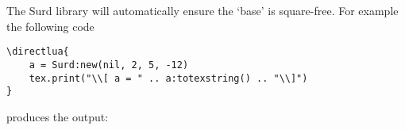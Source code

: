 \documentclass[11pt]{article}
\begin{document}
The Surd library will automatically ensure the `base' is square-free. For example the following code

\begin{lstlisting}
\directlua{
    a = Surd:new(nil, 2, 5, -12)
    tex.print("\\[ a = " .. a:totexstring() .. "\\]")
}    
\end{lstlisting}
produces the output: 
\end{document}
